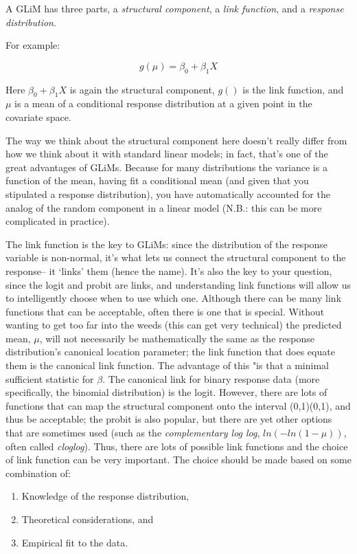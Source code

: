 \documentclass[
]{book}
\providecommand{\tightlist}{%
  \setlength{\itemsep}{0pt}\setlength{\parskip}{0pt}}
\begin{document}
A GLiM has three parts, a \emph{structural component}, a \emph{link function}, and a \emph{response distribution}.

For example:

\[g(μ)=β_0+β_1 X\]

Here \(β_0 + β_1 X\) is again the structural component, \(g()\) is the link function,
and \(μ\) is a mean of a conditional response distribution at a given point in the covariate space.

The way we think about the structural component here doesn't really differ from how we think about it
with standard linear models; in fact, that's one of the great advantages of GLiMs.
Because for many distributions the variance is a function of the mean,
having fit a conditional mean (and given that you stipulated a response distribution),
you have automatically accounted for the analog of the random component in a linear model
(N.B.: this can be more complicated in practice).

The link function is the key to GLiMs:
since the distribution of the response variable is non-normal,
it's what lets us connect the structural component to the response--
it `links' them (hence the name).
It's also the key to your question, since the logit and probit are links,
and understanding link functions will allow us to intelligently choose when to use which one.
Although there can be many link functions that can be acceptable,
often there is one that is special.
Without wanting to get too far into the weeds (this can get very technical) the predicted mean, \(μ\),
will not necessarily be mathematically the same as
the response distribution's canonical location parameter;
the link function that does equate them is the canonical link function.
The advantage of this "is that a minimal sufficient statistic for \(β\).
The canonical link for binary response data (more specifically, the binomial distribution) is the logit.
However, there are lots of functions that can map the structural component onto the interval (0,1)(0,1),
and thus be acceptable; the probit is also popular, but there are yet
other options that are sometimes used (such as the \emph{complementary log log}, \(ln(−ln(1−μ))\),
often called \emph{cloglog}).
Thus, there are lots of possible link functions and
the choice of link function can be very important.
The choice should be made based on some combination of:

\begin{enumerate}
\def\labelenumi{\arabic{enumi}.}
\tightlist
\item
  Knowledge of the response distribution,
\item
  Theoretical considerations, and
\item
  Empirical fit to the data.
\end{enumerate}
\end{document}
